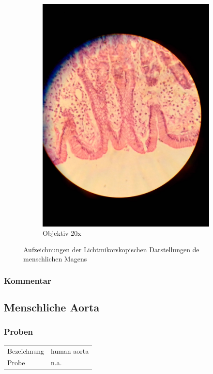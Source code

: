 \begin{figure}[h!]
\begin{subfigure}[b]{0.3\textwidth}
		\includegraphics[width=1\textwidth]{../images/03_stomach.jpg}
		\caption{Objektiv 20x}
	\end{subfigure}
	\caption{Aufzeichnungen der Lichtmikorskopischen Darstellungen de
		menschlichen Magens}
\end{figure}

\subsubsection{Kommentar}

\newpage
\subsection{Menschliche Aorta}

\subsubsection{Proben}
\begin{table}[h!]
	\centering
	\begin{tabular}{l l}
		Bezeichnung	& human aorta \\
		Probe 		& n.a.
	\end{tabular}
\end{table}

